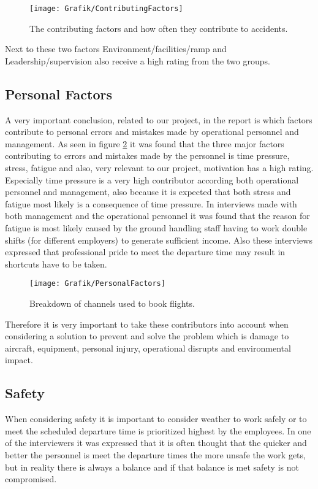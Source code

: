 \begin{figure}[H]
\centering
\texttt{[image: Grafik/ContributingFactors]}
\caption{The contributing factors and how often they contribute to accidents.}
\label{ContributingFactors}
\end{figure}

Next to these two factors Environment/facilities/ramp and Leadership/supervision also receive a high rating from the two groups. 

\newpage
\subsection{Personal Factors} %
A very important conclusion, related to our project, in the report is which factors contribute to personal errors and mistakes made by operational personnel and management. As seen in figure \ref{PersonalFactors} it was found that the three major factors contributing to errors and mistakes made by the personnel is time pressure, stress, fatigue and also, very relevant to our project, motivation has a high rating. Especially time pressure is a very high contributor according both operational personnel and management, also because it is expected that both stress and fatigue most likely is a consequence of time pressure. In interviews made with both management and the operational personnel it was found that the reason for fatigue is most likely caused by the ground handling staff having to work double shifts (for different employers) to generate sufficient income. Also these interviews expressed that professional pride to meet the departure time may result in shortcuts have to be taken.

\begin{figure}[H]
\centering
\texttt{[image: Grafik/PersonalFactors]}
\caption{Breakdown of channels used to book flights.}
\label{PersonalFactors}
\end{figure}

Therefore it is very important to take these contributors into account when considering a solution to prevent and solve the problem which is damage to aircraft, equipment, personal injury, operational disrupts and environmental impact.

\subsection{Safety}
When considering safety it is important to consider weather to work safely or to meet the scheduled departure time is prioritized highest by the employees. In one of the interviewers it was expressed that it is often thought that the quicker and better the personnel is meet the departure times the more unsafe the work gets, but in reality there is always a balance and if that balance is met safety is not compromised.

